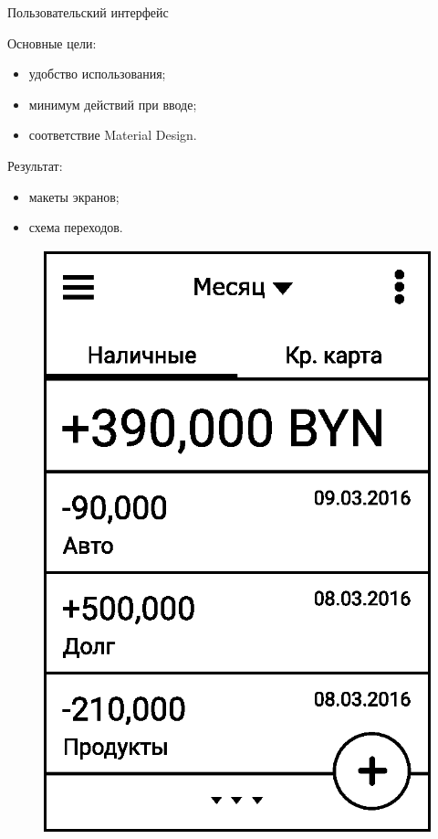 \documentclass[hyperref={pdftex,unicode}]{beamer}
\begin{document}
\begin{frame}{Пользовательский интерфейс}
  \begin{minipage}{0.55\linewidth}
    Основные цели:
    \begin{itemize}
    \item удобство использования;
    \item минимум действий при вводе;
    \item соответствие Material Design.
    \end{itemize}

    Результат:
    \begin{itemize}
    \item макеты экранов;
    \item схема переходов.
    \end{itemize}
  \end{minipage}
  \hfill
  \begin{minipage}{0.35\linewidth}
    \begin{figure}[h!]
      \centering
      \includegraphics[width=\textwidth]{fig/ui_activities_balance_text_chrono.eps}
    \end{figure}
  \end{minipage}
\end{frame}
\end{document}
